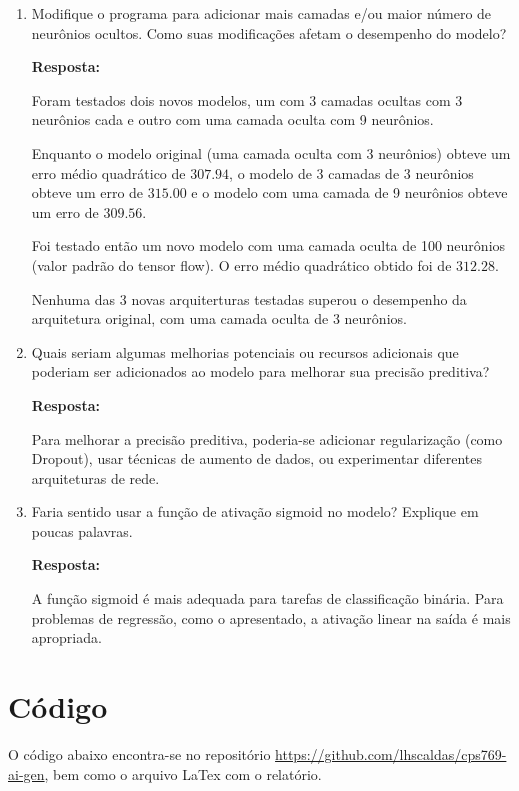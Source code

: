 \documentclass[12 pt]{article}
\begin{document}
\begin{enumerate}
    \item Modifique o programa para adicionar mais camadas e/ou maior número de neurônios ocultos. Como suas modificações afetam o desempenho do modelo?
    
       
    \textbf{Resposta:} \par

    Foram testados dois novos modelos, um com 3 camadas ocultas com 3 neurônios cada e outro com uma camada oculta com 9 neurônios. 

    Enquanto o modelo original (uma camada oculta com 3 neurônios) obteve um erro médio quadrático de $307.94$, o modelo de 3 camadas de 3 neurônios obteve um erro de $315.00$ e o modelo com uma camada de 9 neurônios obteve um erro de $309.56$.

    Foi testado então um novo modelo com uma camada oculta de 100 neurônios (valor padrão do tensor flow). O erro médio quadrático obtido foi de $312.28$.

    Nenhuma das 3 novas arquiterturas testadas superou o desempenho da arquitetura original, com uma camada oculta de 3 neurônios. 

    \item Quais seriam algumas melhorias potenciais ou recursos adicionais que poderiam ser adicionados ao modelo para melhorar sua precisão preditiva?
    
       
    \textbf{Resposta:} \par

    Para melhorar a precisão preditiva, poderia-se adicionar regularização (como Dropout), usar técnicas de aumento de dados, ou experimentar diferentes arquiteturas de rede.

    \item Faria sentido usar a função de ativação sigmoid no modelo? Explique em poucas palavras.
       
    \textbf{Resposta:} \par

    A função sigmoid é mais adequada para tarefas de classificação binária. Para problemas de regressão, como o apresentado, a ativação linear na saída é mais apropriada.

\end{enumerate}

\section*{Código}

O código abaixo encontra-se no repositório \href{https://github.com/lhscaldas/cps769-ai-gen}{https://github.com/lhscaldas/cps769-ai-gen}, bem como o arquivo LaTex com o relatório.



\end{document}
